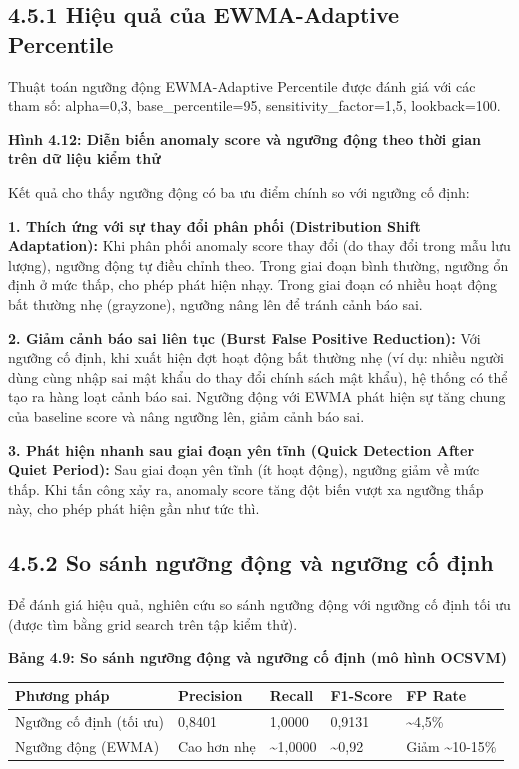 \documentclass[
  a4paper]{report}
\newcounter{none} %
\begin{document}
\subsection{4.5.1 Hiệu quả của EWMA-Adaptive
Percentile}\label{hiux1ec7u-quux1ea3-cux1ee7a-ewma-adaptive-percentile}

Thuật toán ngưỡng động EWMA-Adaptive Percentile được đánh giá với các
tham số: alpha=0,3, base\_percentile=95, sensitivity\_factor=1,5,
lookback=100.

\textbf{Hình 4.12: Diễn biến anomaly score và ngưỡng động theo thời gian
trên dữ liệu kiểm thử}

Kết quả cho thấy ngưỡng động có ba ưu điểm chính so với ngưỡng cố định:

\textbf{1. Thích ứng với sự thay đổi phân phối (Distribution Shift
Adaptation):} Khi phân phối anomaly score thay đổi (do thay đổi trong
mẫu lưu lượng), ngưỡng động tự điều chỉnh theo. Trong giai đoạn bình
thường, ngưỡng ổn định ở mức thấp, cho phép phát hiện nhạy. Trong giai
đoạn có nhiều hoạt động bất thường nhẹ (grayzone), ngưỡng nâng lên để
tránh cảnh báo sai.

\textbf{2. Giảm cảnh báo sai liên tục (Burst False Positive Reduction):}
Với ngưỡng cố định, khi xuất hiện đợt hoạt động bất thường nhẹ (ví dụ:
nhiều người dùng cùng nhập sai mật khẩu do thay đổi chính sách mật
khẩu), hệ thống có thể tạo ra hàng loạt cảnh báo sai. Ngưỡng động với
EWMA phát hiện sự tăng chung của baseline score và nâng ngưỡng lên, giảm
cảnh báo sai.

\textbf{3. Phát hiện nhanh sau giai đoạn yên tĩnh (Quick Detection After
Quiet Period):} Sau giai đoạn yên tĩnh (ít hoạt động), ngưỡng giảm về
mức thấp. Khi tấn công xảy ra, anomaly score tăng đột biến vượt xa
ngưỡng thấp này, cho phép phát hiện gần như tức thì.

\subsection{4.5.2 So sánh ngưỡng động và ngưỡng cố
định}\label{so-suxe1nh-ngux1b0ux1ee1ng-ux111ux1ed9ng-vuxe0-ngux1b0ux1ee1ng-cux1ed1-ux111ux1ecbnh}

Để đánh giá hiệu quả, nghiên cứu so sánh ngưỡng động với ngưỡng cố định
tối ưu (được tìm bằng grid search trên tập kiểm thử).

\textbf{Bảng 4.9: So sánh ngưỡng động và ngưỡng cố định (mô hình OCSVM)}

{\def\LTcaptype{none} %
\begin{longtable}[]{@{}lllll@{}}
\toprule\noalign{}
Phương pháp & Precision & Recall & F1-Score & FP Rate \\
\midrule\noalign{}
\endhead
\bottomrule\noalign{}
\endlastfoot
Ngưỡng cố định (tối ưu) & 0,8401 & 1,0000 & 0,9131 &
\textasciitilde4,5\% \\
Ngưỡng động (EWMA) & Cao hơn nhẹ & \textasciitilde1,0000 &
\textasciitilde0,92 & Giảm \textasciitilde10-15\% \\
\end{longtable}
}
\end{document}
